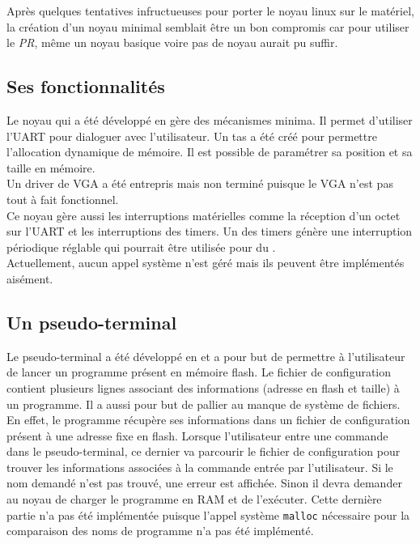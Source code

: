 Après quelques tentatives infructueuses pour porter le noyau linux sur le matériel, la création d'un noyau minimal semblait être un bon compromis car pour utiliser le \textit{PR}, même un noyau basique voire pas de noyau aurait pu suffir.

\subsection{Ses fonctionnalités}

Le noyau qui a été développé en  gère des mécanismes minima. Il permet d'utiliser l'UART pour dialoguer avec l'utilisateur. Un tas a été créé pour permettre l'allocation dynamique de mémoire. Il est possible de paramétrer sa position et sa taille en mémoire.\\
Un driver de VGA a été entrepris mais non terminé puisque le VGA n'est pas tout à fait fonctionnel.\\
Ce noyau gère aussi les interruptions matérielles comme la réception d'un octet sur l'UART et les interruptions des timers.
Un des timers génère une interruption périodique réglable qui pourrait être utilisée pour du .\\
Actuellement, aucun appel système n'est géré mais ils peuvent être implémentés aisément.

\subsection{Un pseudo-terminal}

Le pseudo-terminal a été développé en  et a pour but de permettre à l'utilisateur de lancer un programme présent en mémoire flash. Le fichier de configuration contient plusieurs lignes associant des informations (adresse en flash et taille) à un programme. Il a aussi pour but de pallier au manque de système de fichiers. En effet, le programme récupère ses informations dans un fichier de configuration présent à une adresse fixe en flash. Lorsque l'utilisateur entre une commande dans le pseudo-terminal, ce dernier va parcourir le fichier de configuration pour trouver les informations associées à la commande entrée par l'utilisateur. Si le nom demandé n'est pas trouvé, une erreur est affichée. Sinon il devra demander au noyau de charger le programme en RAM et de l'exécuter. Cette dernière partie n'a pas été implémentée puisque l'appel système \texttt{malloc} nécessaire pour la comparaison des noms de programme n'a pas été implémenté.

